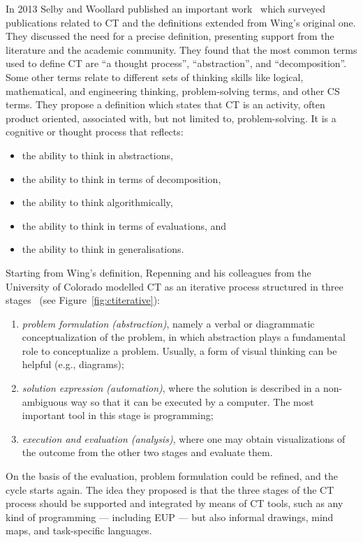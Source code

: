 In 2013 Selby and Woollard published an important work~\cite{eps346937} which surveyed publications related to \ac{CT} and the definitions extended from Wing's original one. They discussed the need for a precise definition, presenting support from the literature and the academic community. They found that the most common terms used to define \ac{CT} are ``a thought process'', ``abstraction'', and ``decomposition''. Some other terms relate to different sets of thinking skills like logical, mathematical, and engineering thinking, problem-solving terms, and other \ac{CS} terms. They propose a definition which states that \ac{CT} is an activity, often product oriented, associated with, but not limited to, problem-solving. It is a cognitive or thought process that reflects:
\begin{itemize}
  \item the ability to think in abstractions,
  \item the ability to think in terms of decomposition,
  \item the ability to think algorithmically,
  \item the ability to think in terms of evaluations, and
  \item the ability to think in generalisations.
\end{itemize}

Starting from Wing's definition, Repenning and his colleagues from the University of Colorado modelled \ac{CT} as an iterative process structured in three stages~\cite{Repenning:fy} (see Figure~\ref{fig:ctiterative}):
\begin{enumerate}
  \item \textit{problem formulation (abstraction)}, namely a verbal or di\-a\-gram\-mat\-ic con\-cep\-tu\-al\-i\-za\-tion of the problem, in which abstraction plays a fundamental role to conceptualize a problem. Usually, a form of visual thinking can be helpful (e.g., diagrams);
  \item \textit{solution expression (automation)}, where the solution is described in a non-ambiguous way so that it can be executed by a computer. The most important tool in this stage is programming;
  \item \textit{execution and evaluation (analysis)}, where one may obtain visualizations of the outcome from the other two stages and evaluate them.
\end{enumerate}

On the basis of the evaluation, problem formulation could be refined, and the cycle starts again. The idea they proposed is that the three stages of the \ac{CT} process should be supported and integrated by means of \ac{CT} tools, such as any kind of programming --- including \ac{EUP} --- but also informal drawings, mind maps, and task-specific languages.

